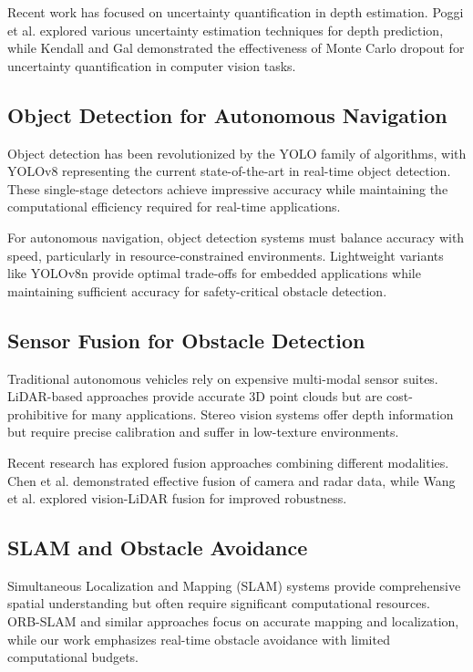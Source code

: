 \documentclass[10pt]{article}
\begin{document}
Recent work has focused on uncertainty quantification in depth estimation. Poggi et al. \cite{poggi2020uncertainty} explored various uncertainty estimation techniques for depth prediction, while Kendall and Gal \cite{kendall2017uncertainties} demonstrated the effectiveness of Monte Carlo dropout for uncertainty quantification in computer vision tasks.

\subsection{Object Detection for Autonomous Navigation}

Object detection has been revolutionized by the YOLO family of algorithms, with YOLOv8 \cite{jocher2023ultralytics} representing the current state-of-the-art in real-time object detection. These single-stage detectors achieve impressive accuracy while maintaining the computational efficiency required for real-time applications.

For autonomous navigation, object detection systems must balance accuracy with speed, particularly in resource-constrained environments. Lightweight variants like YOLOv8n provide optimal trade-offs for embedded applications while maintaining sufficient accuracy for safety-critical obstacle detection.

\subsection{Sensor Fusion for Obstacle Detection}

Traditional autonomous vehicles rely on expensive multi-modal sensor suites. LiDAR-based approaches \cite{geiger2012we} provide accurate 3D point clouds but are cost-prohibitive for many applications. Stereo vision systems \cite{menze2015joint} offer depth information but require precise calibration and suffer in low-texture environments.

Recent research has explored fusion approaches combining different modalities. Chen et al. \cite{chen2020multi} demonstrated effective fusion of camera and radar data, while Wang et al. \cite{wang2021multi} explored vision-LiDAR fusion for improved robustness.

\subsection{SLAM and Obstacle Avoidance}

Simultaneous Localization and Mapping (SLAM) systems provide comprehensive spatial understanding but often require significant computational resources. ORB-SLAM \cite{mur2015orb} and similar approaches focus on accurate mapping and localization, while our work emphasizes real-time obstacle avoidance with limited computational budgets.
\end{document}

